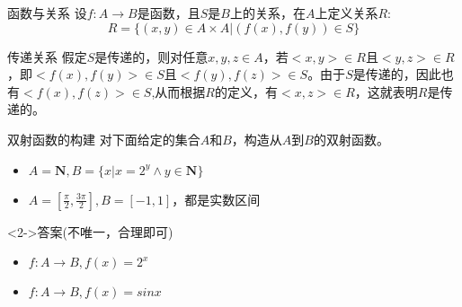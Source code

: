 \documentclass[xetex,10pt,aspectratio=43]{beamer}
\begin{document}
\begin{frame}{函数与关系}
	设$f:A\rightarrow B$是函数，且$S$是$B$上的关系，在$A$上定义关系$R$:$$R=\{(x,y)\in A\times A|(f(x),f(y))\in S\}$$
	
	\begin{block}{传递关系}
		假定$S$是传递的，则对任意$x,y,z\in A$，若$<x,y>\in R$且$<y,z>\in R$，即$<f(x),f(y)>\in S$且$<f(y),f(z)>\in S$。由于$S$是传递的，因此也有$<f(x),f(z)>\in S$,从而根据$R$的定义，有$<x,z>\in R$，这就表明$R$是传递的。
	\end{block}
	
\end{frame}

\begin{frame}{双射函数的构建}
	对下面给定的集合$A$和$B$，构造从$A$到$B$的双射函数。
	\begin{itemize}
		\item<0-> $A = \mathbf{N},B=\{x|x=2^{y}\wedge y\in \mathbf{N}\}$
		\item<0-> $A=[\frac{\pi}{2},\frac{3\pi}{2}],B=[-1,1]$，都是实数区间
	\end{itemize}

	\begin{block}<2->{答案(不唯一，合理即可)}
		\begin{itemize}
			\item $f:A\rightarrow B,f(x)=2^{x}$
			\item $f:A\rightarrow B,f(x)=sinx$
		\end{itemize}
		
	\end{block}
\end{frame}
\end{document}
